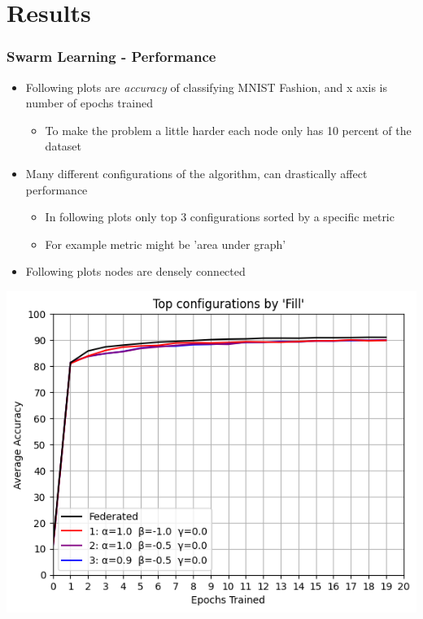 \documentclass{beamer}
\begin{document}
	\section{Results}

	\begin{frame}
		\frametitle{Swarm Learning - Performance}
		\begin{itemize}
			\item Following plots are \emph{accuracy} of classifying MNIST Fashion, and x axis is number of epochs trained
			\begin{itemize}
				\item To make the problem a little harder each node only has 10 percent of the dataset
			\end{itemize}
			\item Many different configurations of the algorithm, can drastically affect performance
			\begin{itemize}
				\item In following plots only top 3 configurations sorted by a specific metric
				\item For example metric might be 'area under graph'
			\end{itemize}
		\item Following plots nodes are densely connected
		\end{itemize}
	\end{frame}

	\begin{frame}
		\includegraphics[width = \textwidth]{fill}
	\end{frame}
\end{document}
